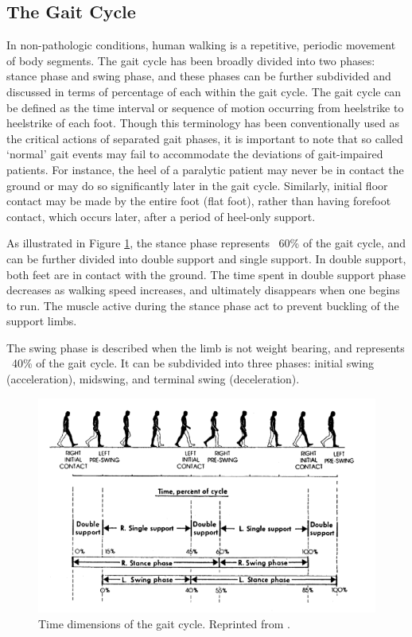 \documentclass[11pt, oneside]{report}   	%
\begin{document}
\subsection{The Gait Cycle}

In non-pathologic conditions, human walking is a repetitive, periodic movement of body segments. The gait cycle has been broadly divided into two phases: stance phase and swing phase, and these phases can be further subdivided and discussed in terms of percentage of each within the gait cycle\cite{Tao2012}. The gait cycle can be defined as the time interval or sequence of motion occurring from heelstrike to heelstrike of each foot. Though this terminology has been conventionally used as the critical actions of separated gait phases, it is important to note that so called `normal' gait events may fail to accommodate the deviations of gait-impaired patients\cite{Tao2012}. For instance, the heel of a paralytic patient may never be in contact the ground or may do so significantly later in the gait cycle. Similarly, initial floor contact may be made by the entire foot (flat foot), rather than having forefoot contact, which occurs later, after a period of heel-only support\cite{Tao2012}.

As illustrated in Figure \ref{fig:gait_cycle}, the stance phase represents ~60\% of the gait cycle, and can be further divided into double support and single support. In double support, both feet are in contact with the ground. The time spent in double support phase decreases as walking speed increases, and ultimately disappears when one begins to run. The muscle active during the stance phase act to prevent buckling of the support limbs.

The swing phase is described when the limb is not weight bearing, and represents ~40\% of the gait cycle. It can be subdivided into three phases: initial swing (acceleration), midswing, and terminal swing (deceleration). 

\begin{figure}
  \centering
    \includegraphics[scale=1.1]{gait_cycle}
  \caption{Time dimensions of the gait cycle. Reprinted from \cite{Inman1981}.}
  \label{fig:gait_cycle}
\end{figure}
\end{document}
